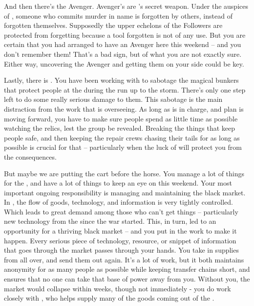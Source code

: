\documentclass[char]{GL2020}
\begin{document}
And then there’s the Avenger. Avenger’s are \cGenesis{}’s secret weapon. Under the auspices of \cGensis{}, someone who commits murder in \cGenesis{\their} name is forgotten by others, instead of forgotten themselves. Supposedly the upper echelons of the Followers are protected from forgetting because a tool forgotten is not of any use. But you are certain that you had arranged to have an Avenger here this weekend -- and you don’t remember them! That’s a bad sign, but of what you are not exactly sure. Either way, uncovering the Avenger and getting them on your side could be key.

Lastly, there is \cChupStudent{}. You have been working with \cChupStudent{\them} to sabotage the magical bunkers that protect people at the \pSchool{} during the run up to the storm. There’s only one step left to do some really serious damage to them. This sabotage is the \pGoaties{} main distraction from the work that \cChupLeader{} is overseeing. As long as \cChupLeader{} is in charge, and \cChupLeader{\their} plan is moving forward, you have to make sure people spend as little time as possible watching the relics, lest the group be revealed. Breaking the things that keep people safe, and then keeping the repair crews chasing their tails for as long as possible is crucial for that -- particularly when the luck of \cGenesis{} will protect you from the consequences.

But maybe we are putting the cart before the horse. You manage a lot of things for the \pGoaties{}, and have a lot of things to keep an eye on this weekend. Your most important ongoing responsibility is managing and maintaining the black market. In \pEarth{}, the flow of goods, technology, and information is very tightly controlled. Which leads to great demand among those who can’t get things -- particularly new technology from the \pTech{} since the war started. This, in turn, led to an opportunity for a thriving black market -- and you put in the work to make it happen.  Every serious piece of technology, resource, or snippet of information that goes through the market passes through your hands. You take in supplies from all over, and send them out again. It’s a lot of work, but it both maintains anonymity for as many people as possible while keeping transfer chains short, and ensures that no one can take that base of power away from you. Without you, the market would collapse within weeks, though not immediately - you do work closely with \cChupInventor{}, who helps supply many of the goods coming out of the \pTech{}.
\end{document}
